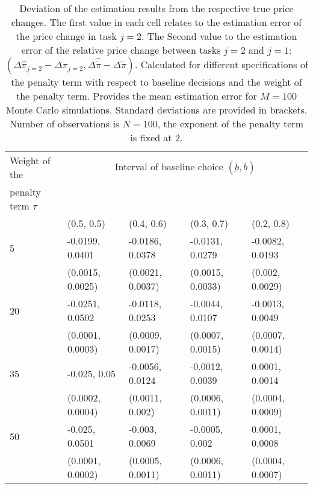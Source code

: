 \documentclass{article}
\newcommand\B{\rule[-1.5ex]{0pt}{0pt}}							%
\begin{document}
		\begin{table}
		\begin{tabular}{lllll}
		\toprule
		Weight of the 		& \multicolumn{4}{c}{Interval of baseline choice $(\underbar{b}, \bar{b})$}						\\
		penalty term $\tau$	&						&						&						&						\\				
		\cmidrule{2-5}
						  	&  (0.5, 0.5)			&  (0.4, 0.6)			&  (0.3, 0.7)			&  (0.2, 0.8)			\\
		\midrule										
		5					&  -0.0199, 0.0401		&  -0.0186, 0.0378		&  -0.0131, 0.0279		&  -0.0082, 0.0193		\\ \B
					      	&  (0.0015, 0.0025)		&  (0.0021, 0.0037)		&  (0.0015, 0.0033)		&  (0.002, 0.0029)		\\
		20					&  -0.0251, 0.0502		&  -0.0118, 0.0253		&  -0.0044, 0.0107		&  -0.0013, 0.0049		\\ \B
						  	&  (0.0001, 0.0003)		&  (0.0009, 0.0017)		&  (0.0007, 0.0015)		&  (0.0007, 0.0014)		\\
		35					&  -0.025, 0.05			&  -0.0056, 0.0124		&  -0.0012, 0.0039		&  0.0001, 0.0014		\\ \B
						  	&  (0.0002, 0.0004)		&  (0.0011, 0.002)		&  (0.0006, 0.0011)		&  (0.0004, 0.0009)		\\
		50					&  -0.025, 0.0501		&  -0.003, 0.0069		&  -0.0005, 0.002		&  0.0001, 0.0008		\\ \B
						 	&  (0.0001, 0.0002)		&  (0.0005, 0.0011)		&  (0.0006, 0.0011)		&  (0.0004, 0.0007)		\\
		\bottomrule

		\end{tabular}
		\caption{Deviation of the estimation results from the respective true price changes. The first value in each cell relates to the estimation error of the price change in task $j=2$. The Second value to the estimation error of the relative price change between tasks $j=2$ and $j=1$: $(\Delta \hat{\pi}_{j=2} - \Delta \pi_{j=2},  \Delta \hat{\tilde{\pi}} - \Delta \tilde{\pi})$. Calculated for different specifications of the penalty term with respect to baseline decisions and the weight of the penalty term. Provides the mean estimation error for $M = 100$ Monte Carlo simulations. Standard deviations are provided in brackets. Number of observations is $N = 100$, the exponent of the penalty term is fixed at 2.}
		\label{tab:est_rslt_differences_pw}
		\end{table}


\newpage
\end{document}
